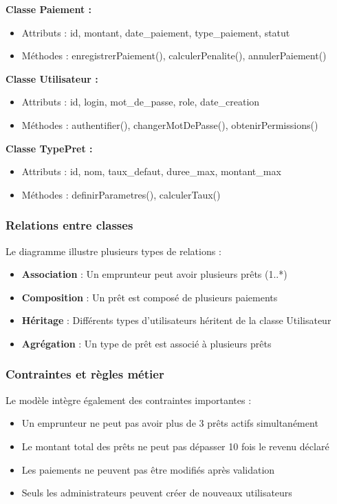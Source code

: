 \documentclass[12pt,a4paper]{report}
\begin{document}
\textbf{Classe Paiement :}
\begin{itemize}
    \item Attributs : id, montant, date\_paiement, type\_paiement, statut
    \item Méthodes : enregistrerPaiement(), calculerPenalite(), annulerPaiement()
\end{itemize}

\textbf{Classe Utilisateur :}
\begin{itemize}
    \item Attributs : id, login, mot\_de\_passe, role, date\_creation
    \item Méthodes : authentifier(), changerMotDePasse(), obtenirPermissions()
\end{itemize}

\textbf{Classe TypePret :}
\begin{itemize}
    \item Attributs : id, nom, taux\_defaut, duree\_max, montant\_max
    \item Méthodes : definirParametres(), calculerTaux()
\end{itemize}

\subsubsection{Relations entre classes}

Le diagramme illustre plusieurs types de relations :
\begin{itemize}
    \item \textbf{Association} : Un emprunteur peut avoir plusieurs prêts (1..*)
    \item \textbf{Composition} : Un prêt est composé de plusieurs paiements
    \item \textbf{Héritage} : Différents types d'utilisateurs héritent de la classe Utilisateur
    \item \textbf{Agrégation} : Un type de prêt est associé à plusieurs prêts
\end{itemize}

\subsubsection{Contraintes et règles métier}

Le modèle intègre également des contraintes importantes :
\begin{itemize}
    \item Un emprunteur ne peut pas avoir plus de 3 prêts actifs simultanément
    \item Le montant total des prêts ne peut pas dépasser 10 fois le revenu déclaré
    \item Les paiements ne peuvent pas être modifiés après validation
    \item Seuls les administrateurs peuvent créer de nouveaux utilisateurs
\end{itemize}
\end{document}

